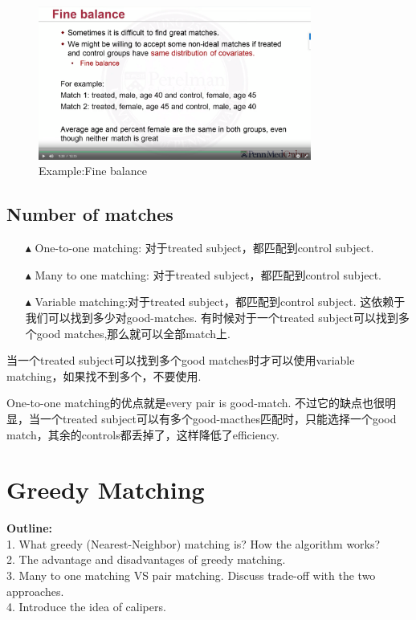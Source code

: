 \begin{figure}
	\setlength{\abovecaptionskip}{0pt}     %
	\setlength{\belowcaptionskip}{10pt}
	\vspace{-0cm}  %
	\setlength{\abovecaptionskip}{-0cm}   %
	\setlength{\belowcaptionskip}{-0cm}   %
	\centering
	\includegraphics[width=0.8\textwidth]{figure/finebalance.png}
	\caption{Example:Fine balance}
	\label{finebalance}
\end{figure}


\subsection{Number of matches}
\begin{itemize}
	\item[$\blacktriangle$] One-to-one matching: 对于{\color{red}{每一个}}treated subject，都匹配到{\color{red}{一个}}control subject.
	
	\item[$\blacktriangle$] Many to one matching: 对于{\color{red}{每一个}}treated subject，都匹配到{\color{red}{K个}}control subject.
	\item[$\blacktriangle$] Variable matching:对于{\color{red}{每一个}}treated subject，都匹配到{\color{red}{未知个数的}}control subject.
	这依赖于我们可以找到多少对good-matches. 有时候对于一个treated subject可以找到多个good matches,那么就可以全部match上. 
\end{itemize}

当一个treated subject可以找到多个good matches时才可以使用variable matching，如果找不到多个，不要使用.

One-to-one matching的优点就是every pair is good-match. 不过它的缺点也很明显，当一个treated subject可以有多个good-macthes匹配时，只能选择一个good match，其余的controls都丢掉了，这样降低了efficiency.

\newpage \section{Greedy Matching}
\label{greedy}
{\bfseries Outline:}\\
1. What greedy (Nearest-Neighbor) matching is? How the  algorithm works?\\
2. The advantage and disadvantages of greedy matching.\\
3. Many to one matching VS pair matching. Discuss trade-off with the two approaches. \\
4. Introduce the idea of calipers.

